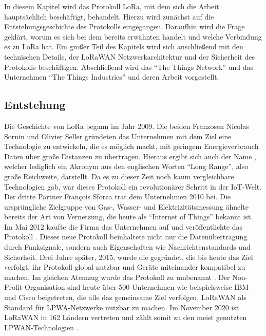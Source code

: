 In diesem Kapitel wird das Protokoll LoRa, mit dem sich die Arbeit hauptsächlich beschäftigt, behandelt. Hierzu wird zunächst auf die Entstehungsgeschichte des Protokolls eingegangen. Daraufhin wird die Frage geklärt, worum es sich bei dem bereits erwähnten  handelt und welche Verbindung es zu LoRa hat. Ein großer Teil des Kapitels wird sich anschließend mit den technischen Details, der LoRaWAN Netzwerkarchitektur und der Sicherheit des Protokolls beschäftigen. Abschließend wird das ``The Things Network'' und das Unternehmen ``The Things Industries'' und deren Arbeit vorgestellt.

\subsection{Entstehung} 
\label{sec:ThHi:entstehung}

Die Geschichte von LoRa begann im Jahr 2009. Die beiden Franzosen Nicolas Sornin und Olivier Seller gründeten das Unternehmen  mit dem Ziel eine Technologie zu entwickeln, die es möglich macht, mit geringem Energieverbrauch Daten über große Distanzen zu übertragen. Hieraus ergibt sich auch der Name , welcher lediglich ein Akronym aus den englischen Worten ``Long Range'', also große Reichweite, darstellt. Da es zu dieser Zeit noch kaum vergleichbare Technologien gab, war dieses Protokoll ein revolutionärer Schritt in der IoT-Welt. Der dritte Partner François Sforza trat dem Unternehmen 2010 bei. Die ursprüngliche Zielgruppe von Gas-, Wasser- und Elektrizitätsmessung ähnelte bereits der Art von Vernetzung, die heute als ``Internet of Things'' bekannt ist. Im Mai 2012 kaufte die Firma  das Unternehmen auf und veröffentlichte das Protokoll . Dieses neue Protokoll beinhaltete nicht nur die Datenübertragung durch Funksignale, sondern auch Eigenschaften wie Nachrichtenstandards und Sicherheit. Drei Jahre später, 2015, wurde die  gegründet, die bis heute das Ziel verfolgt, ihr Protokoll global nutzbar und Geräte miteinander kompatibel zu machen. Im gleichen Atemzug wurde das Protokoll zu  umbenannt . Der Non-Profit-Organisation sind heute über 500 Unternehmen wie beispielsweise IBM und Cisco beigetreten, die alle das gemeinsame Ziel verfolgen, LoRaWAN als Standard für LPWA-Netzwerke nutzbar zu machen. Im November 2020 ist LoRaWAN in 162 Ländern vertreten und zählt somit zu den meist genutzten LPWAN-Technologien .

